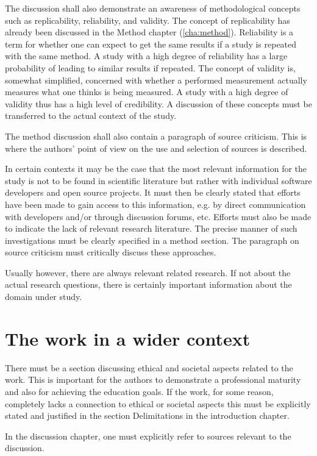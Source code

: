 The discussion shall also demonstrate an awareness of methodological
concepts such as replicability, reliability, and validity. The concept
of replicability has already been discussed in the Method chapter
(\ref{cha:method}). Reliability is a term for whether one can expect
to get the same results if a study is repeated with the same method. A
study with a high degree of reliability has a large probability of
leading to similar results if repeated. The concept of validity is,
somewhat simplified, concerned with whether a performed measurement
actually measures what one thinks is being measured. A study with a
high degree of validity thus has a high level of credibility. A
discussion of these concepts must be transferred to the actual context
of the study.

The method discussion shall also contain a paragraph of
source criticism. This is where the authors’ point of view on
the use and selection of sources is described.

In certain contexts it may be the case that the most relevant
information for the study is not to be found in scientific
literature but rather with individual software developers and
open source projects. It must then be clearly stated that
efforts have been made to gain access to this information,
e.g. by direct communication with developers and/or through
discussion forums, etc. Efforts must also be made to indicate
the lack of relevant research literature. The precise manner
of such investigations must be clearly specified in a method
section. The paragraph on source criticism must critically
discuss these approaches.

Usually however, there are always relevant related research.
If not about the actual research questions, there is certainly
important information about the domain under study.

\section{The work in a wider context}
\label{sec:work-wider-context}

There must be a section discussing ethical and societal
aspects related to the work. This is important for the authors
to demonstrate a professional maturity and also for achieving
the education goals. If the work, for some reason, completely
lacks a connection to ethical or societal aspects this must be
explicitly stated and justified in the section Delimitations in
the introduction chapter.

In the discussion chapter, one must explicitly refer to sources
relevant to the discussion.


